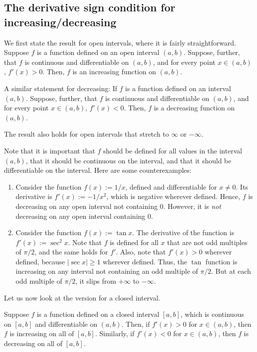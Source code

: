 \documentclass{amsart}
\begin{document}
\subsection{The derivative sign condition for increasing/decreasing}

We first state the result for open intervals, where it is fairly
straightforward. Suppose $f$ is a function defined on an open interval
$(a,b)$. Suppose, further, that $f$ is continuous and differentiable
on $(a,b)$, and for every point $x \in (a,b)$, $f'(x) > 0$. Then, $f$
is an increasing function on $(a,b)$.

A similar statement for decreasing: If $f$ is a function defined on an
interval $(a,b)$. Suppose, further, that $f$ is continuous and
differentiable on $(a,b)$, and for every point $x \in (a,b)$, $f'(x) <
0$. Then, $f$ is a decreasing function on $(a,b)$.

The result also holds for open intervals that stretch to $\infty$ or
$-\infty$.

Note that it is important that $f$ should be defined for all
values in the interval $(a,b)$, that it should be continuous on the
interval, and that it should be differentiable on the interval. Here
are some counterexamples:

\begin{enumerate}

\item Consider the function $f(x) := 1/x$, defined and differentiable
  for $x \ne 0$. Its derivative is $f'(x) := -1/x^2$, which is
  negative wherever defined. Hence, $f$ is decreasing on any open
  interval not containing $0$. However, it is {\em not} decreasing on
  any open interval containing $0$.
\item Consider the function $f(x) := \tan x$. The derivative of the
  function is $f'(x) := \sec^2 x$. Note that $f$ is defined for all
  $x$ that are not odd multiples of $\pi/2$, and the same holds for
  $f'$. Also, note that $f'(x) > 0$ wherever defined, because $|\sec
  x| \ge 1$ wherever defined. Thus, the $\tan$ function is increasing
  on any interval not containing an odd multiple of $\pi/2$. But at
  each odd multiple of $\pi/2$, it slips from $+\infty$ to $-\infty$.

\end{enumerate}

Let us now look at the version for a closed interval. 

Suppose $f$ is a function defined on a closed interval $[a,b]$, which
is continuous on $[a,b]$ and differentiable on $(a,b)$. Then, if
$f'(x) > 0$ for $x \in (a,b)$, then $f$ is increasing on all of
$[a,b]$. Similarly, if $f'(x) < 0$ for $x \in (a,b)$, then $f$ is
decreasing on all of $[a,b]$.
\end{document}
